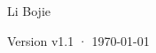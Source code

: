 \begin{titlepage}
\vfill
{\LARGE\sffamily Li Bojie\par}
\vspace{0.7cm}
{\small\sffamily\color{structurecolor!80} Version v1.1 · \today\par}
\vspace{1.2cm}
\end{titlepage}

